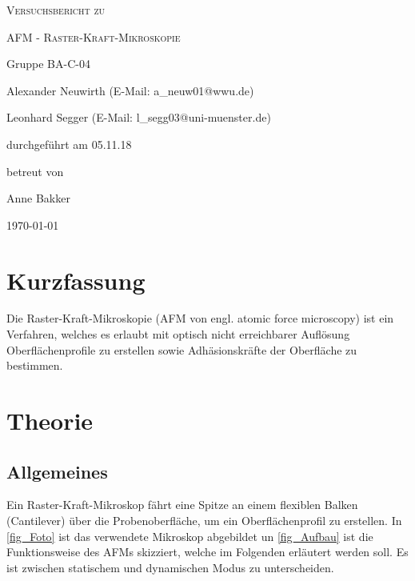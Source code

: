 \documentclass[
	a4paper,
	12pt,
	pagesize,
	ngerman
]{scrartcl}
\begin{document}
	\begin{titlepage}
		\centering
		{\scshape\LARGE Versuchsbericht zu \par}
		\vspace{1cm}
		{\scshape\huge AFM - Raster-Kraft-Mikroskopie \par}
		\vspace{2.5cm}
		{\LARGE Gruppe BA-C-04 \par}
		\vspace{0.5cm}

		{\large Alexander Neuwirth (E-Mail: a\_neuw01@wwu.de) \par}
		{\large Leonhard Segger (E-Mail: l\_segg03@uni-muenster.de) \par}
		\vfill

		durchgeführt am 05.11.18\par
		betreut von\par
		{\large Anne Bakker}

		\vfill

		{\large \today\par}
	\end{titlepage}
	\tableofcontents
	\newpage


	\section{Kurzfassung}
	Die Raster-Kraft-Mikroskopie (AFM von engl. atomic force microscopy) ist ein Verfahren, welches es erlaubt mit optisch nicht erreichbarer Auflösung Oberflächenprofile zu erstellen sowie Adhäsionskräfte der Oberfläche zu bestimmen. %

	\section{Theorie}
	\label{sec_theorie}

	\subsection{Allgemeines}
	Ein Raster-Kraft-Mikroskop fährt eine Spitze an einem flexiblen Balken (Cantilever) über die Probenoberfläche, um ein Oberflächenprofil zu erstellen.
	In \cref{fig_Foto} ist das verwendete Mikroskop abgebildet un \cref{fig_Aufbau} ist die Funktionsweise des AFMs skizziert, welche im Folgenden erläutert werden soll.
	Es ist zwischen statischem und dynamischen Modus zu unterscheiden.
	
\end{document}
